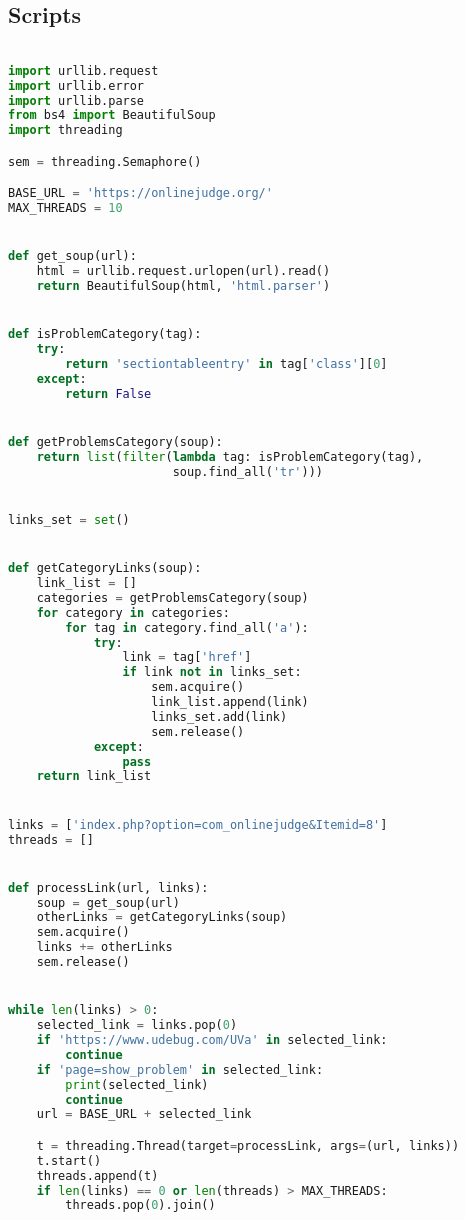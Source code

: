 \begin{apendicesenv}

\partapendices

\chapter{Scripts}
\label{appendix:b}

\begin{lstlisting}[language=Python, caption={Script para coletar número de problemas — Online Judge}, label={appendix:script_oj}]

import urllib.request
import urllib.error
import urllib.parse
from bs4 import BeautifulSoup
import threading

sem = threading.Semaphore()

BASE_URL = 'https://onlinejudge.org/'
MAX_THREADS = 10


def get_soup(url):
    html = urllib.request.urlopen(url).read()
    return BeautifulSoup(html, 'html.parser')


def isProblemCategory(tag):
    try:
        return 'sectiontableentry' in tag['class'][0]
    except:
        return False


def getProblemsCategory(soup):
    return list(filter(lambda tag: isProblemCategory(tag),
                       soup.find_all('tr')))


links_set = set()


def getCategoryLinks(soup):
    link_list = []
    categories = getProblemsCategory(soup)
    for category in categories:
        for tag in category.find_all('a'):
            try:
                link = tag['href']
                if link not in links_set:
                    sem.acquire()
                    link_list.append(link)
                    links_set.add(link)
                    sem.release()
            except:
                pass
    return link_list


links = ['index.php?option=com_onlinejudge&Itemid=8']
threads = []


def processLink(url, links):
    soup = get_soup(url)
    otherLinks = getCategoryLinks(soup)
    sem.acquire()
    links += otherLinks
    sem.release()


while len(links) > 0:
    selected_link = links.pop(0)
    if 'https://www.udebug.com/UVa' in selected_link:
        continue
    if 'page=show_problem' in selected_link:
        print(selected_link)
        continue
    url = BASE_URL + selected_link

    t = threading.Thread(target=processLink, args=(url, links))
    t.start()
    threads.append(t)
    if len(links) == 0 or len(threads) > MAX_THREADS:
        threads.pop(0).join()


\end{lstlisting}
\end{apendicesenv}
